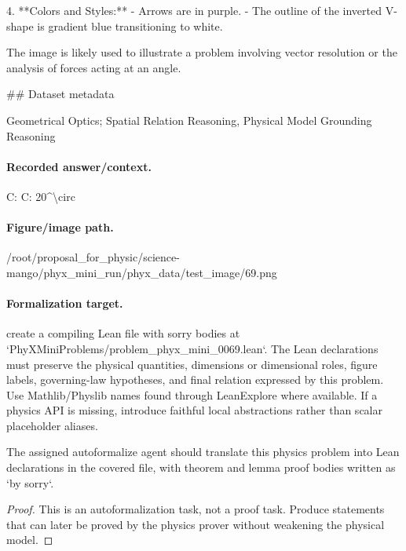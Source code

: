 4. **Colors and Styles:**
   - Arrows are in purple.
   - The outline of the inverted V-shape is gradient blue transitioning to white.

The image is likely used to illustrate a problem involving vector resolution or the analysis of forces acting at an angle.

\#\# Dataset metadata

Geometrical Optics; Spatial Relation Reasoning, Physical Model Grounding Reasoning

\paragraph{Recorded answer/context.}
C: C: 20\textasciicircum{}\textbackslash{}circ

\paragraph{Figure/image path.}
/root/proposal\_for\_physic/science-mango/phyx\_mini\_run/phyx\_data/test\_image/69.png

\paragraph{Formalization target.}
create a compiling Lean file with sorry bodies at `PhyXMiniProblems/problem\_phyx\_mini\_0069.lean`. The Lean declarations must preserve the physical quantities, dimensions or dimensional roles, figure labels, governing-law hypotheses, and final relation expressed by this problem.
Use Mathlib/Physlib names found through LeanExplore where available. If a physics API is missing, introduce faithful local abstractions rather than scalar placeholder aliases.

\begin{theorem}
\label{thm:physics:phyx_mini_0069:target}
The assigned autoformalize agent should translate this physics problem into Lean declarations in the covered file, with theorem and lemma proof bodies written as `by sorry`.
\end{theorem}
\begin{proof}
This is an autoformalization task, not a proof task. Produce statements that can later be proved by the physics prover without weakening the physical model.
\end{proof}

